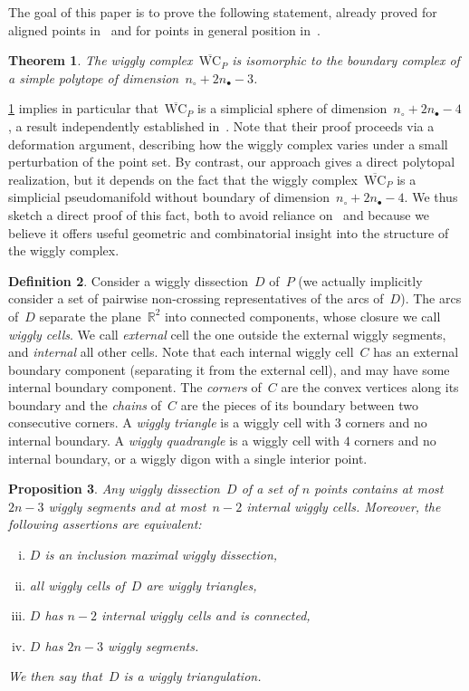 \documentclass{amsart}
\newtheorem{theorem}{Theorem}%
\newtheorem{proposition}[theorem]{Proposition}
\theoremstyle{definition}
\newtheorem{definition}[theorem]{Definition}
\newcommand{\R}{\mathbb{R}} %
\newcommand{\darkblue}{\color{darkblue}} %
\newcommand{\defn}[1]{\textsl{\darkblue #1}} %
\newcommand{\reducedWigglyComplex}{\overline{\mathrm{WC}}} %
\begin{document}
The goal of this paper is to prove the following statement, already proved for aligned points in~\cite{BapatPilaud} and for points in general position in~\cite{RoteSantosStreinu-polytope}.

\begin{theorem}
\label{thm:polytope}
The wiggly complex~$\reducedWigglyComplex_P$ is isomorphic to the boundary complex of a simple polytope of dimension~$n_\circ+2n_\bullet-3$.
\end{theorem}

\cref{thm:polytope} implies in particular that~$\reducedWigglyComplex_P$ is a simplicial sphere of dimension~$n_\circ+2n_\bullet-4$, a result independently established in~\cite[Coro.~3.21]{BapatDeopurkarLicata}.
Note that their proof proceeds via a deformation argument, describing how the wiggly complex varies under a small perturbation of the point set.
By contrast, our approach gives a direct polytopal realization, but it depends on the fact that the wiggly complex~$\reducedWigglyComplex_P$ is a simplicial pseudomanifold without boundary of dimension~$n_\circ+2n_\bullet-4$.
We thus  sketch a direct proof of this fact, both to avoid reliance on~\cite[Coro.~3.21]{BapatDeopurkarLicata} and because we believe it offers useful geometric and combinatorial insight into the structure of the wiggly complex.

\begin{definition}
Consider a wiggly dissection~$D$ of~$P$ (we actually implicitly consider a set of pairwise non-crossing representatives of the arcs of~$D$).
The arcs of~$D$ separate the plane~$\R^2$ into connected components, whose closure we call \defn{wiggly cells}.
We call \defn{external} cell the one outside the external wiggly segments, and \defn{internal} all other cells.
Note that each internal wiggly cell~$C$ has an external boundary component (separating it from the external cell), and may have some internal boundary component.
The \defn{corners} of~$C$ are the convex vertices along its boundary and the \defn{chains} of~$C$ are the pieces of its boundary between two consecutive corners.
A \defn{wiggly triangle} is a wiggly cell with $3$ corners and no internal boundary.
A \defn{wiggly quadrangle} is a wiggly cell with $4$ corners and no internal boundary, or a wiggly digon with a single interior point.
\end{definition}

\begin{proposition}
Any wiggly dissection~$D$ of a set of $n$ points contains at most $2n-3$ wiggly segments and at most~$n-2$ internal wiggly cells.
Moreover, the following assertions are equivalent:
\begin{enumerate}[(i)]
\item $D$ is an inclusion maximal wiggly dissection,
\item all wiggly cells of~$D$ are wiggly triangles,
\item $D$ has $n-2$ internal wiggly cells and is connected,
\item $D$ has $2n-3$ wiggly segments.
\end{enumerate}
We then say that~$D$ is a \defn{wiggly triangulation}.
\end{proposition}
\end{document}
